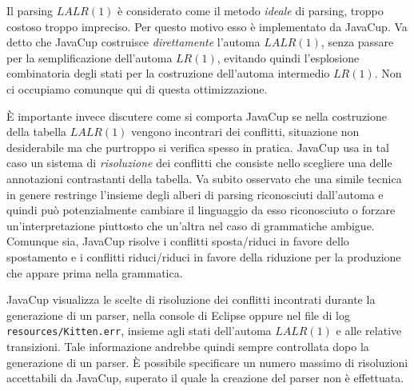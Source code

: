 Il parsing $\mathit{LALR}(1)$ \`e considerato come il metodo \emph{ideale} di
parsing, \nec troppo costoso \nec troppo impreciso. Per questo motivo esso
\`e implementato da JavaCup. Va detto che JavaCup costruisce
\emph{direttamente}
l'automa $\mathit{LALR}(1)$, senza passare per la semplificazione dell'automa
$\mathit{LR}(1)$, evitando quindi l'esplosione combinatoria degli stati per la
costruzione dell'automa intermedio $\mathit{LR}(1)$.
Non ci occupiamo comunque qui di questa ottimizzazione.

\`E importante invece discutere come si comporta JavaCup se nella
costruzione della tabella $\mathit{LALR}(1)$ vengono incontrari dei
conflitti, situazione non desiderabile ma che purtroppo si verifica
spesso in pratica. JavaCup usa in tal caso un sistema di \emph{risoluzione}
dei conflitti che consiste nello scegliere una delle annotazioni contrastanti
della tabella. Va subito osservato che una simile tecnica
in genere restringe l'insieme
degli alberi di parsing riconosciuti dall'automa e quindi pu\`o potenzialmente
cambiare il linguaggio da esso riconosciuto o forzare un'interpretazione
piuttosto che un'altra nel caso di grammatiche ambigue. Comunque sia,
JavaCup risolve i conflitti sposta/riduci in favore dello spostamento e i
conflitti riduci/riduci in favore della riduzione per la produzione che
appare prima nella grammatica.

JavaCup visualizza le scelte di risoluzione dei conflitti incontrati durante la generazione
di un parser, nella console di Eclipse oppure
nel file di log \texttt{resources/Kitten.err}, insieme agli stati dell'automa
$\mathit{LALR}(1)$ e alle relative transizioni. Tale informazione andrebbe quindi
sempre controllata dopo la generazione di un parser. \`E possibile specificare
un numero massimo di risoluzioni accettabili da JavaCup, superato il quale
la creazione del parser non \`e effettuata.
%
